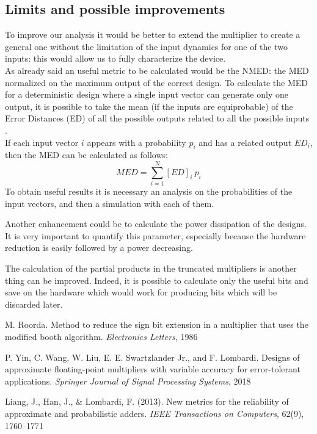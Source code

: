 \documentclass[a4paper]{article}
\begin{document}
	\subsection{Limits and possible improvements}
	To improve our analysis it would be better to extend the multiplier to create a general one without the limitation of the input dynamics for one of the two inputs: this would allow us to fully characterize the device.\\
	As already said an useful metric to be calculated would be the NMED: the MED normalized on the maximum output of the correct design. To calculate the MED for a deterministic design where a single input vector can generate only one output, it is possible to take the mean (if the inputs are equiprobable) of the Error Distances (ED) of all the possible outputs related to all the possible inputs \cite{liang}.\\
	If each input vector $i$ appears with a probability $p_i$ and has a related output $ED_i$, then the MED can be calculated as follows:
	\begin{equation}
		MED = \displaystyle\sum_{i=1}^{N} [ED]_i\ p_i
	\end{equation}
	To obtain useful results it is necessary an analysis on the probabilities of the input vectors, and then a simulation with each of them.

	Another enhancement could be to calculate the power dissipation of the designs. It is very important to quantify this parameter, especially because the hardware reduction is easily followed by a power decreasing.

	The calculation of the partial products in the truncated multipliers is another thing can be improved. Indeed, it is possible to calculate only the useful bits and save on the hardware which would work for producing bits which will be discarded later.
	
	

	\begin{thebibliography}{3}
	M. Roorda. Method to reduce the sign bit extension in a multiplier that uses the modified
	booth algorithm. \textit{Electronics Letters}, 1986

	P. Yin, C. Wang, W. Liu, E. E. Swartzlander Jr., and F. Lombardi. Designs of approximate
	floating-point multipliers with variable accuracy for error-tolerant applications. \textit{Springer
	Journal of Signal Processing Systems}, 2018

	Liang, J., Han, J., \& Lombardi, F. (2013). New metrics for the
	reliability of approximate and probabilistic adders. \textit{IEEE
	Transactions on Computers}, 62(9), 1760–1771
	\end{thebibliography}
\end{document}

